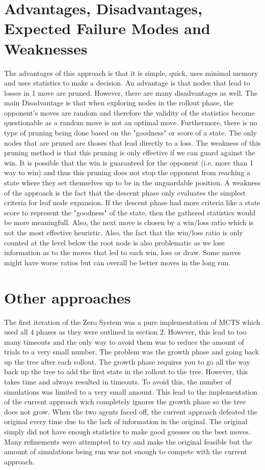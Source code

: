 \documentclass[12pt]{article} %
\begin{document}
\section{Advantages, Disadvantages, Expected Failure Modes and Weaknesses}
The advantages of this approach is that it is simple, quick, uses minimal memory and uses statistics to make a decision. An advantage is that nodes that lead to losses in 1 move are pruned.
However, there are many disadvantages as well. The main Disadvantage is that when exploring nodes in the rollout phase, the opponent's moves are random and therefore 
the validity of the statistics become questionable as a random move is not an optimal move. Furthermore, there is no type of pruning being done based on the "goodness" or score of a state. 
The only nodes that are pruned are thoses that lead directly to a loss. The weakness of this pruning method is that this pruning is only effective if we can guard against the win. It is 
possible that the win is guaranteed for the opponent (i.e. more than 1 way to win) and thus this pruning does not stop the opponent from reaching a state where they set themselves up to
be in the unguardable position. A weakness of the approach is the fact that the descent phase only evaluates the simplest criteria for leaf node expansion. If the descent phase had more 
criteria like a state score to represent the "goodness" of the state, then the gathered statistics would be more meaningfull. Also, the next move is chosen by a win/loss ratio which
is not the most effective heuristic. Also, the fact that the win/loss ratio is only counted at the level below the root node is also problematic as we lose information as to the moves
that led to each win, loss or draw. Some moves might have worse ratios but can overall be better moves in the long run.

\section{Other approaches}
The first iteration of the Zero System was a pure implementation of MCTS which used all 4 phases as they were outlined in section 2. However, this lead to too many timeouts and the only way 
to avoid them was to reduce the amount of trials to a very small number. The problem was the growth phase and going back up the tree after each rollout. The growth phase requires 
you to go all the way back up the tree to add the first state in the rollout to the tree. However, this takes time and always resulted in timeouts. To avoid this, the number of 
simulations was limited to a very small amount. This lead to the implementation of the current approach wich completely ignores the growth phase so the tree does not 
grow. When the two agents faced off, the current approach defeated the original every time due to the lack of information in the original. The original simply did not have 
enough statistics to make good guesses on the best moves. Many refinements were attempted to try and make the original feasible but the amount of simulations being run was not 
enough to compete with the current approach.
\end{document}
